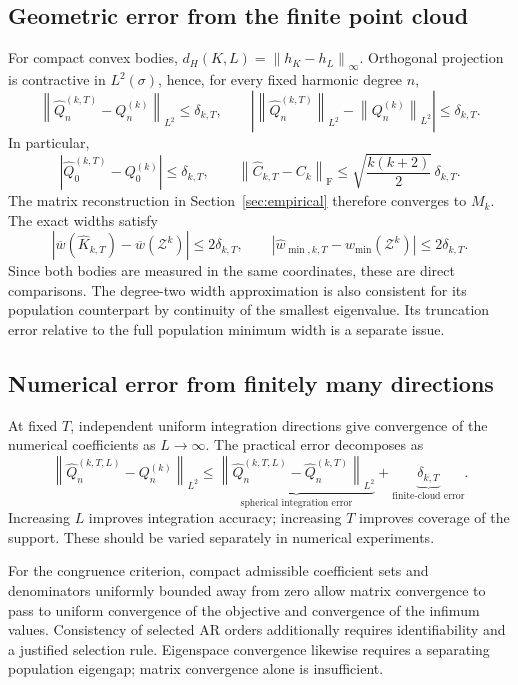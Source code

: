 \documentclass[11pt,a4paper]{article}
\newcommand{\norm}[1]{\left\lVert #1\right\rVert}
\newcommand{\Frob}{\mathrm F}
\newcommand{\hQ}{\widehat Q}
\newcommand{\hC}{\widehat C}
\begin{document}
\subsection*{Geometric error from the finite point cloud}
For compact convex bodies, $d_H(K,L)=\norm{h_K-h_L}_\infty$. Orthogonal projection
is contractive in $L^2(\sigma)$, hence, for every fixed harmonic degree $n$,
\[
 \boxed{\quad
 \norm{\hQ_n^{(k,T)}-Q_n^{(k)}}_{L^2}\le\delta_{k,T},\qquad
 \left|\norm{\hQ_n^{(k,T)}}_{L^2}-\norm{Q_n^{(k)}}_{L^2}\right|
 \le\delta_{k,T}.
 \quad}
\]
In particular,
\[
 |\hQ_0^{(k,T)}-Q_0^{(k)}|\le\delta_{k,T},\qquad
 \norm{\hC_{k,T}-C_k}_{\Frob}
 \le\sqrt{\frac{k(k+2)}2}\,\delta_{k,T}.
\]
The matrix reconstruction in Section~\ref{sec:empirical} therefore converges to
$M_k$. The exact widths satisfy
\[
 |\overline w(\widehat K_{k,T})-\overline w(\mathcal Z^k)|\le2\delta_{k,T},\qquad
 |\widehat w_{\min,k,T}-w_{\min}(\mathcal Z^k)|\le2\delta_{k,T}.
\]
Since both bodies are measured in the same coordinates, these are direct
comparisons. The degree-two width approximation is also consistent for its
population counterpart by continuity of the smallest eigenvalue. Its truncation
error relative to the full population minimum width is a separate issue.

\subsection*{Numerical error from finitely many directions}
At fixed $T$, independent uniform integration directions give convergence of the
numerical coefficients as $L\to\infty$. The practical error decomposes as
\[
 \norm{\hQ_n^{(k,T,L)}-Q_n^{(k)}}_{L^2}
 \le
 \underbrace{\norm{\hQ_n^{(k,T,L)}-\hQ_n^{(k,T)}}_{L^2}}
 _{\text{spherical integration error}}
 +\underbrace{\delta_{k,T}}_{\text{finite-cloud error}}.
\]
Increasing $L$ improves integration accuracy; increasing $T$ improves coverage
of the support. These should be varied separately in numerical experiments.

For the congruence criterion, compact admissible coefficient sets and denominators
uniformly bounded away from zero allow matrix convergence to pass to uniform
convergence of the objective and convergence of the infimum values. Consistency
of selected AR orders additionally requires identifiability and a justified
selection rule. Eigenspace convergence likewise requires a separating population
eigengap; matrix convergence alone is insufficient.

\newpage
\end{document}
